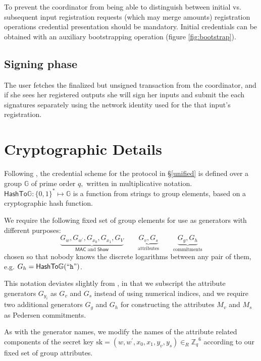 \documentclass{article}
\begin{document}
To prevent the coordinator from being able to distinguish between initial vs. subsequent input registration requests (which may merge amounts) registration operations credential presentation should be mandatory. Initial credentials can be obtained with an auxiliary bootstrapping operation (figure \ref{fig:bootstrap}).

\subsection{Signing phase}

The user fetches the finalized but unsigned transaction from the coordinator, and if she sees her registered outputs she will sign her inputs and submit the each signatures separately using the network identity used for the that input's registration.

\section{Cryptographic Details}\label{details}

Following \cite{chase2019signal}, the credential scheme for the protocol in \S\ref{unified} is defined over a group \(\mathbb{G}\) of prime order \(q,\) written in multiplicative notation.
$\mathsf{HashTo\mathbb{G}} : \{0,1\}^{*} \mapsto \mathbb{G}$ is a function from strings to group elements, based on a cryptographic hash function\cite{fouque2012indifferentiable}.

We require the following fixed set of group elements for use as generators with different purposes:
\[
\underbrace{G_{w}, G_{w^{\prime}}, G_{x_{0}}, G_{x_{1}}, G_{V}}_{\mathsf{MAC} \text{~and~} \mathsf{Show}}
\qquad
\underbrace{G_{v}, G_{s}}_{\text{attributes}}
\qquad
\underbrace{G_g, G_h}_{\text{commitments}}
\]
chosen so that nobody knows the discrete logarithms between any pair of them, e.g. $G_h = \mathsf{HashTo\mathbb{G}}(``\texttt{h}")$.

This notation deviates slightly from \cite{chase2019signal}, in that we subscript the attribute generators $G_{y_i}$ as $G_v$ and $G_s$ instead of using numerical indices, and we require two additional generators $G_g$ and $G_h$ for constructing the attributes $M_v$ and $M_s$ as Pedersen commitments.

As with the generator names, we modify the names of the attribute related components of the secret key
$\mathrm{sk} = (w, w^{\prime}, x_{0}, x_{1}, y_{v}, y_{s}) \in_R {\mathbb{Z}_q}^6$
according to our fixed set of group attributes.
\end{document}
